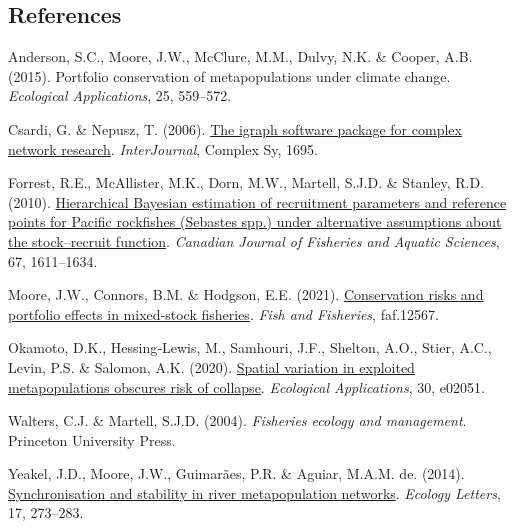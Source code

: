 \documentclass[
]{article}
\newlength{\cslhangindent}
\newlength{\cslentryspacingunit} %
\newenvironment{CSLReferences}[2] %
 {%
  \setlength{\parindent}{0pt}
  \ifodd #1
  \let\oldpar\par
  \def\par{\hangindent=\cslhangindent\oldpar}
  \fi
  \setlength{\parskip}{#2\cslentryspacingunit}
 }%
 {}
\begin{document}
\hypertarget{references}{%
\subsection*{References}\label{references}}

\hypertarget{refs}{}
\begin{CSLReferences}{1}{0}
\leavevmode{}%
Anderson, S.C., Moore, J.W., McClure, M.M., Dulvy, N.K. \& Cooper, A.B.
(2015). {Portfolio conservation of metapopulations under climate
change.} \emph{Ecological Applications}, 25, 559--572.

\leavevmode{}%
Csardi, G. \& Nepusz, T. (2006). \href{https://igraph.org}{{The igraph
software package for complex network research}}. \emph{InterJournal},
Complex Sy, 1695.

\leavevmode{}%
Forrest, R.E., McAllister, M.K., Dorn, M.W., Martell, S.J.D. \& Stanley,
R.D. (2010). \href{https://doi.org/10.1139/f10-077}{{Hierarchical
Bayesian estimation of recruitment parameters and reference points for
Pacific rockfishes (Sebastes spp.) under alternative assumptions about
the stock--recruit function}}. \emph{Canadian Journal of Fisheries and
Aquatic Sciences}, 67, 1611--1634.

\leavevmode{}%
Moore, J.W., Connors, B.M. \& Hodgson, E.E. (2021).
\href{https://doi.org/10.1111/faf.12567}{{Conservation risks and
portfolio effects in mixed‐stock fisheries}}. \emph{Fish and Fisheries},
faf.12567.

\leavevmode{}%
Okamoto, D.K., Hessing‐Lewis, M., Samhouri, J.F., Shelton, A.O., Stier,
A.C., Levin, P.S. \& Salomon, A.K. (2020).
\href{https://doi.org/10.1002/eap.2051}{{Spatial variation in exploited
metapopulations obscures risk of collapse}}. \emph{Ecological
Applications}, 30, e02051.

\leavevmode{}%
Walters, C.J. \& Martell, S.J.D. (2004). \emph{{Fisheries ecology and
management}}. Princeton University Press.

\leavevmode{}%
Yeakel, J.D., Moore, J.W., Guimarães, P.R. \& Aguiar, M.A.M. de. (2014).
\href{https://doi.org/10.1111/ele.12228}{{Synchronisation and stability
in river metapopulation networks}}. \emph{Ecology Letters}, 17,
273--283.

\end{CSLReferences}
\end{document}

